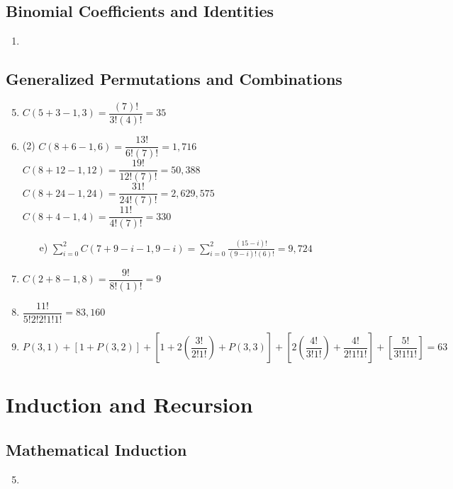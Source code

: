 \documentclass[12pt, A4]{article}
\begin{document}
		\subsection{Binomial Coefficients and Identities}
			\begin{enumerate}
				\item
			\end{enumerate}
		\subsection{Generalized Permutations and Combinations}
			\begin{enumerate}
				\setcounter{enumi}{4}
				\item
					\(C(5 + 3 - 1, 3) = \dfrac{(7)!}{3!(4)!} = 35\)
				\setcounter{enumi}{8}
				\item
					\begin{tasks}(2)
						\task
							\(C(8 + 6 - 1, 6) = \dfrac{13!}{6!(7)!} = 1,716\)	
						\task
							\(C(8 + 12 - 1, 12) = \dfrac{19!}{12!(7)!} = 50,388\)
						\task
							\(C(8 + 24 - 1, 24) = \dfrac{31!}{24!(7)!} = 2,629,575\)
						\task
							\(C(8 + 4 - 1, 4) = \dfrac{11!}{4!(7)!} = 330\)
					\end{tasks}
					\begin{itemize}[leftmargin = 1.04cm]
						\item[e)]
							\(\displaystyle \sum_{i = 0}^{2} C(7 + 9 - i - 1, 9 - i) = \sum_{i = 0}^2 \frac{(15 - i)!}{(9 - i)!(6)!} = 9,724\)	
					\end{itemize}
				\setcounter{enumi}{10}
				\item
					\(C(2 + 8 - 1, 8) = \dfrac{9!}{8!(1)!} = 9\)
				\setcounter{enumi}{32}
				\item
					\(\dfrac{11!}{5!2!2!1!1!} = 83,160\)
				\setcounter{enumi}{34}
				\item
					\(P(3, 1) + [1 + P(3, 2)] + \left[1 + 2\left(\dfrac{3!}{2!1!}\right) + P(3, 3)\right] + \left[2\left(\dfrac{4!}{3!1!}\right) + \dfrac{4!}{2!1!1!}\right] + \left[\dfrac{5!}{3!1!1!}\right] = 63\)
			\end{enumerate}
	\setcounter{section}{4}
	\section{Induction and Recursion}
		\subsection{Mathematical Induction}
			\begin{enumerate}
				\setcounter{enumi}{4}
				\item	
			\end{enumerate}
\end{document}
